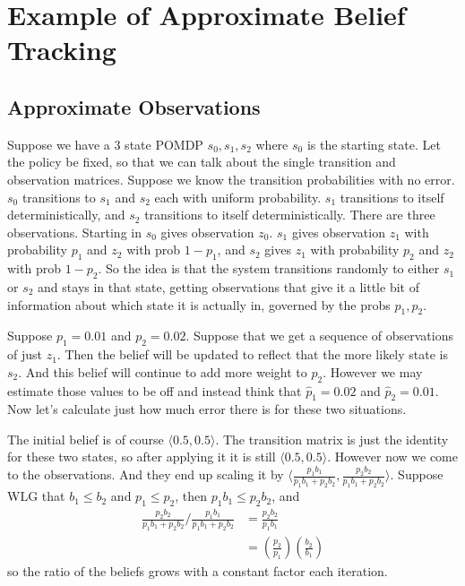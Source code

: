 \documentclass[10pt,english]{article}
\begin{document}
\section{Example of Approximate Belief Tracking}

\subsection{Approximate Observations}

Suppose we have a 3 state POMDP $s_0, s_1, s_2$ where $s_0$ is the starting state. Let the policy be fixed, so that we can talk about the single transition and observation matrices. Suppose we know the transition probabilities with no error. $s_0$ transitions to $s_1$ and $s_2$ each with uniform probability. $s_1$ transitions to itself deterministically, and $s_2$ transitions to itself deterministically. There are three observations. Starting in $s_0$ gives observation $z_0$. $s_1$ gives observation $z_1$ with probability $p_1$ and $z_2$ with prob $1-p_1$, and $s_2$ gives $z_1$ with probability $p_2$ and $z_2$ with prob $1-p_2$. So the idea is that the system transitions randomly to either $s_1$ or $s_2$ and stays in that state, getting observations that give it a little bit of information about which state it is actually in, governed by the probs $p_1,p_2$.

Suppose $p_1 = 0.01$ and $p_2 = 0.02$. Suppose that we get a sequence of observations of just $z_1$. Then the belief will be updated to reflect that the more likely state is $s_2$. And this belief will continue to add more weight to $p_2$. However we may estimate those values to be off and instead think that $\hat{p}_1 = 0.02$ and $\hat{p}_2 = 0.01$. Now let's calculate just how much error there is for these two situations.

The initial belief is of course $\langle 0.5, 0.5 \rangle$. The transition matrix is just the identity for these two states, so after applying it it is still $\langle 0.5, 0.5 \rangle$. However now we come to the observations. And they end up scaling it by $\langle \frac{p_1 b_1}{p_1 b_1 + p_2 b_2} , \frac{p_2 b_2}{p_1 b_1 + p_2 b_2} \rangle$. Suppose WLG that $b_1 \leq b_2$ and $p_1 \leq p_2$, then $p_1 b_1 \leq p_2 b_2$, and
\begin{align}
\frac{p_2 b_2}{p_1 b_1 + p_2 b_2} / \frac{p_1 b_1}{p_1 b_1 + p_2 b_2} &= \frac{p_2 b_2}{p_1 b_1} \\
&= \left( \frac{p_2}{p_1} \right) \left( \frac{b_2}{b_1} \right)
\end{align}
so the ratio of the beliefs grows with a constant factor each iteration.
\end{document}
